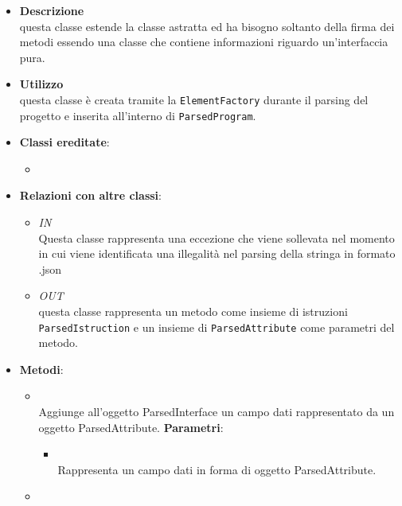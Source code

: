 \begin{itemize}
\item \textbf{Descrizione}\\
questa classe estende la classe astratta  ed ha bisogno soltanto della firma dei metodi essendo una classe che contiene informazioni riguardo un'interfaccia pura.
\item \textbf{Utilizzo}\\
questa classe è creata tramite la \texttt{ElementFactory} durante il parsing del progetto e inserita all'interno di \texttt{ParsedProgram}.
\item \textbf{Classi ereditate}:
\begin{itemize}
\item \hyperref[\nogloxy{swedesigner::server::project::ParsedType}]{}
\end{itemize}
\item \textbf{Relazioni con altre classi}:
\begin{itemize}
\item \textit{IN} \hyperref[\nogloxy{swedesigner::server::project::ParsedException}]{}\\
Questa classe rappresenta una eccezione che viene sollevata nel momento in cui viene identificata una illegalità nel parsing della stringa in formato .json
\item \textit{OUT} \hyperref[\nogloxy{swedesigner::server::project::ParsedMethod}]{}\\
questa classe rappresenta un metodo come insieme di istruzioni \texttt{ParsedIstruction} e un insieme di \texttt{ParsedAttribute} come parametri del metodo.
\end{itemize}
\item \textbf{Metodi}:
\begin{itemize}
\item {}
\\ Aggiunge all'oggetto ParsedInterface un campo dati rappresentato da un oggetto ParsedAttribute.
\textbf{Parametri}:
\begin{itemize}
\item {}
\\ Rappresenta un campo dati in forma di oggetto ParsedAttribute.
\end{itemize}
\item {}

\end{itemize}
\end{itemize}
